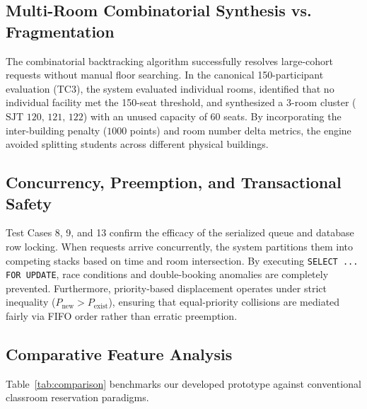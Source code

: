 \documentclass[conference]{IEEEtran}
\begin{document}
\subsection{Multi-Room Combinatorial Synthesis vs. Fragmentation}
The combinatorial backtracking algorithm successfully resolves large-cohort requests without manual floor searching. In the canonical 150-participant evaluation (TC3), the system evaluated individual rooms, identified that no individual facility met the 150-seat threshold, and synthesized a 3-room cluster ($\text{SJT 120, 121, 122}$) with an unused capacity of $60$ seats. By incorporating the inter-building penalty ($1000$ points) and room number delta metrics, the engine avoided splitting students across different physical buildings.

\subsection{Concurrency, Preemption, and Transactional Safety}
Test Cases 8, 9, and 13 confirm the efficacy of the serialized queue and database row locking. When requests arrive concurrently, the system partitions them into competing stacks based on time and room intersection. By executing \texttt{SELECT ... FOR UPDATE}, race conditions and double-booking anomalies are completely prevented. Furthermore, priority-based displacement operates under strict inequality ($P_{\text{new}} > P_{\text{exist}}$), ensuring that equal-priority collisions are mediated fairly via FIFO order rather than erratic preemption.

\subsection{Comparative Feature Analysis}
Table~\ref{tab:comparison} benchmarks our developed prototype against conventional classroom reservation paradigms.
\end{document}
